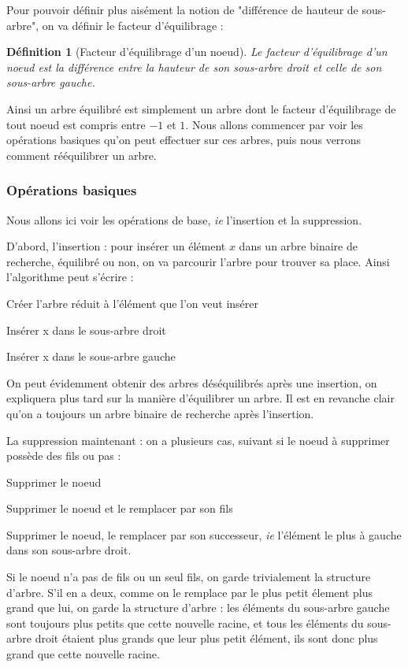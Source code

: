 \documentclass{article}
\newtheorem*{ddef}{Définition}
\begin{document}
Pour pouvoir définir plus aisément la notion de "différence de hauteur de sous-arbre", on va définir le facteur d'équilibrage :

\begin{ddef}[Facteur d'équilibrage d'un noeud]
Le facteur d'équilibrage d'un noeud est la différence entre la hauteur de son sous-arbre droit et celle de son sous-arbre gauche.
\end{ddef}

Ainsi un arbre équilibré est simplement un arbre dont le facteur d'équilibrage de tout noeud est compris entre $-1$ et $1$. Nous allons commencer par voir les opérations basiques qu'on peut effectuer sur ces arbres, puis nous verrons comment rééquilibrer un arbre.

\subsubsection{Opérations basiques}

Nous allons ici voir les opérations de base, \textit{ie} l'insertion et la suppression.

D'abord, l'insertion : pour insérer un élément $x$ dans un arbre binaire de recherche, équilibré ou non, on va parcourir l'arbre pour trouver sa place. Ainsi l'algorithme peut s'écrire :

\begin{algorithmic}

Créer l'arbre réduit à l'élément que l'on veut insérer


Insérer x dans le sous-arbre droit

\Else

Insérer x dans le sous-arbre gauche
\EndIf
\end{algorithmic}
On peut évidemment obtenir des arbres déséquilibrés après une insertion, on expliquera plus tard sur la manière d'équilibrer un arbre. Il est en revanche clair qu'on a toujours un arbre binaire de recherche après l'insertion.

La suppression maintenant : on a plusieurs cas, suivant si le noeud à supprimer possède des fils ou pas :

\begin{algorithmic}

Supprimer le noeud


Supprimer le noeud et le remplacer par son fils

\Else

Supprimer le noeud, le remplacer par son successeur, \textit{ie} l'élément le plus à gauche dans son sous-arbre droit.
\EndIf
\end{algorithmic}
Si le noeud n'a pas de fils ou un seul fils, on garde trivialement la structure d'arbre. S'il en a deux, comme on le remplace par le plus petit élement plus grand que lui, on garde la structure d'arbre : les éléments du sous-arbre gauche sont toujours plus petits que cette nouvelle racine, et tous les éléments du sous-arbre droit étaient plus grands que leur plus petit élément, ils sont donc plus grand que cette nouvelle racine.
\end{document}
